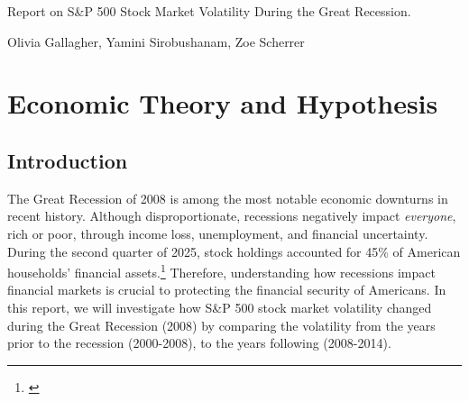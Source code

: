 


\begin{center}
\Large{Report on S\&P 500 Stock Market Volatility During the Great Recession.}

\vspace{0.2in}

\large{Olivia Gallagher, Yamini Sirobushanam, Zoe Scherrer}
\end{center}
\section{Economic Theory and Hypothesis}
\subsection{Introduction}
\indent The Great Recession of 2008 is among the most notable economic downturns in recent history. Although disproportionate, recessions negatively impact \textit{everyone}, rich or poor, through income loss, unemployment, and financial uncertainty. During the second quarter of 2025, stock holdings accounted for 45\% of American households’ financial assets.\footnote{\cite{CNN}} Therefore, understanding how recessions impact financial markets is crucial to protecting the financial security of Americans. In this report, we will investigate how S\&P 500 stock market volatility changed during the Great Recession (2008) by comparing the volatility from the years prior to the recession (2000-2008), to the years following (2008-2014).

